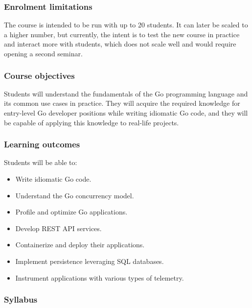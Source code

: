 \documentclass[
  digital,
  color,
  oneside,
  nosansbold,
  nocolorbold,
  nolof,
  nolot,
]{fithesis4}
\begin{document}
\subsubsection{Enrolment limitations}

The course is intended to be run with up to 20 students. It can later be scaled to a higher number, but currently, the intent is to test the new course in practice and interact more with students, which does not scale well and would require opening a second seminar.

\subsubsection{Course objectives}

Students will understand the fundamentals of the Go programming language and its common use cases in practice. They will acquire the required knowledge for entry-level Go developer positions while writing idiomatic Go code, and they will be capable of applying this knowledge to real-life projects.

\subsubsection{Learning outcomes}

Students will be able to:
\begin{itemize}
    \item Write idiomatic Go code.
    \item Understand the Go concurrency model.
    \item Profile and optimize Go applications.
    \item Develop REST API services.
    \item Containerize and deploy their applications.
    \item Implement persistence leveraging SQL databases.
    \item Instrument applications with various types of telemetry.
\end{itemize}

\subsubsection{Syllabus}
\end{document}
